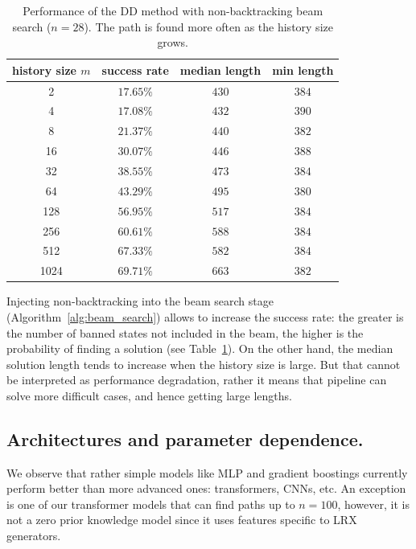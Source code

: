 \documentclass[reqno,11pt]{amsart}
\begin{document}
\begin{table}[ht!]
\centering
\begin{tabular}{|c|c|c|c|}
\hline
history size $m$ & success rate & median length & min length \\
\hline
2     & $17.65\%$ & $430$ & $384$ \\
\hline
4     & $17.08\%$ & $432$ & $390$ \\
\hline
8     & $21.37\%$ & $440$ & $382$ \\
\hline
16    & $30.07\%$ & $446$ & $388$ \\
\hline
32    & $38.55\%$ & $473$ & $384$ \\
\hline
64    & $43.29\%$ & $495$ & $380$ \\
\hline
128   & $56.95\%$ & $517$ & $384$ \\
\hline
256   & $60.61\%$ & $588$ & $384$ \\
\hline
512   & $67.33\%$ & $582$ & $384$ \\
\hline
1024  & $69.71\%$ & $663$ & $382$ \\
\hline
\end{tabular}
\caption{Performance of the DD method with non-backtracking beam search ($n=28$). The path is found more often as the history size grows. }
\label{tab:beam_ban}
\end{table}

Injecting non-backtracking into the beam search stage (Algorithm~\ref{alg:beam_search}) allows to increase the success rate: the greater is the number of banned states not included in the beam, the higher is the probability of finding a solution (see Table~\ref{tab:beam_ban}). On the other hand, the median solution length tends to increase when the history size is large. But that cannot be interpreted as performance degradation, rather it means that pipeline can solve more difficult cases, and hence getting large lengths.  


\subsection{Architectures and parameter dependence. }
We observe that rather simple models like MLP and gradient boostings currently perform better than more advanced ones: transformers, CNNs, etc. An exception is one of our transformer models that can find paths up to $n=100$, however, it is not a zero prior knowledge model since it uses features specific to LRX generators. 
\end{document}
